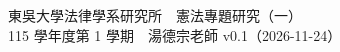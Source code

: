 \documentclass[11pt,oneside,openany]{book}
\newcommand{\documentversion}{v0.1（2026-11-24）}
\begin{document}
\frontmatter
{}%
  {東吳大學法律學系研究所　憲法專題研究（一）\\115 學年度第 1 學期　湯德宗老師}%
  {\documentversion}
\tableofcontents
\mainmatter




\backmatter
\printbibliography[heading=bibintoc,title=參考文獻]
\end{document}
